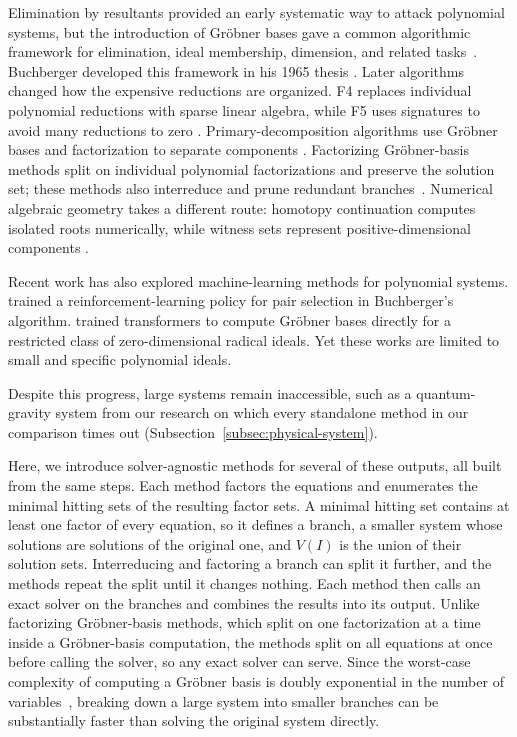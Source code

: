 Elimination by resultants provided an early systematic way to attack polynomial
systems, but the introduction of Gr\"obner bases gave a common algorithmic
framework for elimination, ideal membership, dimension, and related
tasks~\cite{cox2015ideals,kreuzer2000computational}.
Buchberger developed this framework in his 1965 thesis
\cite{buchberger2006thesis}.
Later algorithms changed how the expensive reductions are organized.
F4 replaces individual polynomial reductions with sparse linear
algebra, while F5 uses signatures to avoid many reductions to zero
\cite{faugere1999f4,faugere2002f5}.
Primary-decomposition algorithms use Gr\"obner bases and
factorization to separate components \cite{gianni1988primary}.
Factorizing Gr\"obner-basis methods split on individual polynomial
factorizations and preserve the solution set; these methods also interreduce
and prune redundant branches~\cite{graebe1995factorized,singular2025}.
Numerical algebraic geometry takes a different route: homotopy continuation
computes isolated roots numerically, while witness sets represent
positive-dimensional components
\cite{sommese2001numerical,sommese2005numerical}.

Recent work has also explored machine-learning methods for polynomial systems.
\citet{peifer2020learning} trained a reinforcement-learning policy for pair
selection in Buchberger's algorithm. \citet{kera2024learning} trained
transformers to compute Gr\"obner bases directly for a restricted class of
zero-dimensional radical ideals. Yet these works are
limited to small and specific polynomial ideals.

Despite this progress, large systems remain inaccessible, such as a
quantum-gravity system from our research on which every standalone method in
our comparison times out (Subsection~\ref{subsec:physical-system}).

Here, we introduce solver-agnostic methods for several of these
outputs, all built from the same steps. Each method factors the equations and
enumerates the minimal hitting sets of the resulting factor sets. A minimal
hitting set contains at least one factor of every equation, so it defines a
branch, a smaller system whose solutions are solutions of the original one,
and $V(I)$ is the union of their solution sets. Interreducing and
factoring a branch
can split it further, and the methods repeat the split until it changes
nothing. Each method then calls an exact solver on the branches and combines
the results into its output. Unlike factorizing Gr\"obner-basis methods, which
split on one factorization at a time inside a Gr\"obner-basis computation, the
methods split on all equations at once before calling the solver, so any exact
solver can serve.
Since the worst-case complexity of computing a Gr\"obner basis is
doubly exponential in the number of
variables~\cite{mayr1982complexity}, breaking down a large system
into smaller branches can be substantially faster than solving the
original system directly.

